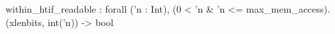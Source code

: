 within_htif_readable : forall ('n : Int), (0 < 'n & 'n <= max_mem_access). (xlenbits, int('n)) -> bool